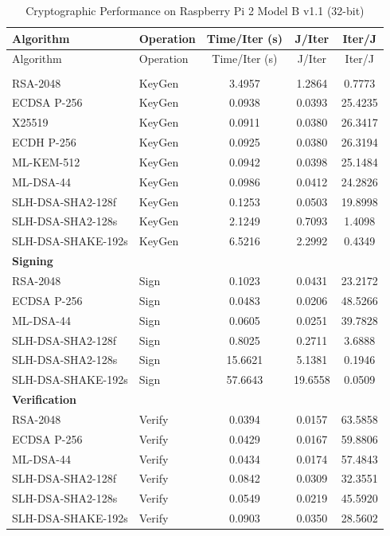 \documentclass[11pt, letterpaper]{article}
\begin{document}
\begin{longtable}{llccc}
\caption{Cryptographic Performance on Raspberry Pi 2 Model B v1.1 (32-bit)} \\
\hline
Algorithm & Operation & Time/Iter (s) & J/Iter & Iter/J \\
\hline
\endfirsthead

\hline
Algorithm & Operation & Time/Iter (s) & J/Iter & Iter/J \\
\hline
\endhead

\hline
\endfoot

\hline
\endlastfoot

\multicolumn{5}{l}{\textbf{Key Generation}} \\

RSA-2048 & KeyGen & 3.4957 & 1.2864 & 0.7773 \\
ECDSA P-256 & KeyGen & 0.0938 & 0.0393 & 25.4235 \\
X25519 & KeyGen & 0.0911 & 0.0380 & 26.3417 \\
ECDH P-256 & KeyGen & 0.0925 & 0.0380 & 26.3194 \\
ML-KEM-512 & KeyGen & 0.0942 & 0.0398 & 25.1484 \\
ML-DSA-44 & KeyGen & 0.0986 & 0.0412 & 24.2826 \\
SLH-DSA-SHA2-128f & KeyGen & 0.1253 & 0.0503 & 19.8998 \\
SLH-DSA-SHA2-128s & KeyGen & 2.1249 & 0.7093 & 1.4098 \\
SLH-DSA-SHAKE-192s & KeyGen & 6.5216 & 2.2992 & 0.4349 \\

\multicolumn{5}{l}{\textbf{Signing}} \\

RSA-2048 & Sign & 0.1023 & 0.0431 & 23.2172 \\
ECDSA P-256 & Sign & 0.0483 & 0.0206 & 48.5266 \\
ML-DSA-44 & Sign & 0.0605 & 0.0251 & 39.7828 \\
SLH-DSA-SHA2-128f & Sign & 0.8025 & 0.2711 & 3.6888 \\
SLH-DSA-SHA2-128s & Sign & 15.6621 & 5.1381 & 0.1946 \\
SLH-DSA-SHAKE-192s & Sign & 57.6643 & 19.6558 & 0.0509 \\

\multicolumn{5}{l}{\textbf{Verification}} \\

RSA-2048 & Verify & 0.0394 & 0.0157 & 63.5858 \\
ECDSA P-256 & Verify & 0.0429 & 0.0167 & 59.8806 \\
ML-DSA-44 & Verify & 0.0434 & 0.0174 & 57.4843 \\
SLH-DSA-SHA2-128f & Verify & 0.0842 & 0.0309 & 32.3551 \\
SLH-DSA-SHA2-128s & Verify & 0.0549 & 0.0219 & 45.5920 \\
SLH-DSA-SHAKE-192s & Verify & 0.0903 & 0.0350 & 28.5602 \\

\end{longtable}
\end{document}
